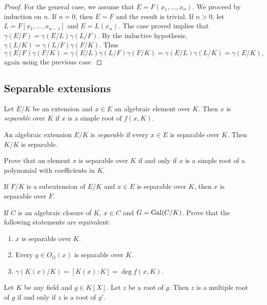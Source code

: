 \begin{proof}
    \medskip 
    For the general case, we assume that $E=F(x_1,\dots,x_n)$. We proceed
    by induction on $n$. If $n=0$, then $E=F$ and the result is trivial. 
    If $n>0$, let $L=F[x_1,\dots,x_{n-1}]$ and $E=L(x_n)$. The 
    case proved 
    implies that $\gamma(E/F)=\gamma(E/L)\gamma(L/F)$. By the inductive 
    hypothesis, $\gamma(L/K)=\gamma(L/F)\gamma(F/K)$. Thus 
    \[
    \gamma(E/F)\gamma(F/K)=\gamma(E/L)\gamma(L/F)\gamma(F/K)
    =\gamma(E/L)\gamma(L/K)=\gamma(E/K),
    \]
    again using the previous case. 
\end{proof}

\subsection{Separable extensions}

\begin{definition}
    Let $E/K$ be an extension and $x\in E$ an algebraic element over $K$. Then
    $x$ is \emph{separable} over $K$ if $x$ is a simple root
    of $f(x,K)$. 
\end{definition}

An algebraic extension $E/K$ is \emph{separable} 
if every $x\in E$ is separable over $K$. Then $K/K$ is separable. 

\begin{exercise}
    Prove that 
    an element $x$ is separable over $K$ if and only if $x$ is a simple root
    of a polynomial with coefficients in $K$. 
\end{exercise}

If $F/K$ is a subextension of $E/K$ and $x\in E$ is separable over $K$, then
$x$ is separable over $F$. 

\begin{exercise}
    If $C$ is an algebraic closure of $K$, $x\in C$ and $G=\operatorname{Gal}(C/K)$. 
    Prove that the following statements are equivalent:
    \begin{enumerate}
        \item $x$ is separable over $K$.
        \item Every $y\in O_G(x)$ is separable over $K$.
        \item $\gamma(K(x)/K)=[K(x):K]=\deg f(x,K)$. 
    \end{enumerate}
\end{exercise}

Let $K$ be any field and $g\in K[X]$. Let $z$ be a root of $g$. 
Then $z$ is a multiple root of $g$ if and only if $z$ is a root of $g'$. 

